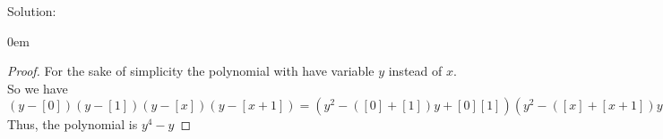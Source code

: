 \documentclass{article} %
\begin{document}
Solution: 
\begin{addmargin}[1em]{0em}
\begin{proof}
For the sake of simplicity the polynomial with have variable $y$ instead of $x$.
\\So we have $(y-[0])(y-[1])(y-[x])(y-[x+1]) = (y^2 - ([0] + [1])y + [0][1])(y^2 - ([x] + [x+1])y + [x][x+1]) = (y^2 - [1]y + [0])(y^2 - [1]y + [1]) = (y^4 - ([1] + [1])y^3 + ([0] + [1] + [1][1])y^2 - ([1][1]+[1][0])y + ([0][1])) = (y^4 - [0]y^3 + [0]y^2 - [1]y + [0]) = y^4 - y$
\\Thus, the polynomial is $y^4 - y$
\end{proof}
\end{addmargin}

\end{document}
